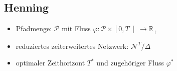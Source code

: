 \documentclass[12pt, a4paper]{article}
\newcommand{\R}{\mathbb{R}}
\newcommand{\ropen}[1]{\ensuremath{\left[#1\right[}}
\newcommand{\func}[3]{\ensuremath{{#1} \colon {#2} \to {#3}}}
\newcommand{\graph}{\mathcal{N}}
\newcommand{\tExp}[1]{\ensuremath{\graph^{#1}}}
\newcommand{\redNetw}[2]{\tExp{#1}\!/{#2}}
\newcommand{\pathSet}{\mathcal{P}}
\begin{document}
\subsection*{Henning}
\begin{itemize}
    \item Pfadmenge: $\pathSet$ mit Fluss $\func{\varphi}{\pathSet \times \ropen{0,T}}{\R_+}$
    \item reduziertes zeiterweitertes Netzwerk: $\redNetw{T}{\Delta}$
    \item optimaler Zeithorizont $T^*$ und zugehöriger Fluss $\varphi^*$
\end{itemize}
\end{document}
